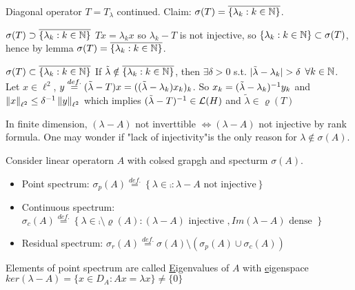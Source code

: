 \begin{example}\nl
	Diagonal operator $T=T_\lambda$ continued. Claim: $\sigma(T)=\overline{\{\lambda_k:k\in\mathbb{N}\}}$.
	\begin{pf}{$\sigma(T)\supset\overline{\{\lambda_k:k\in\mathbb{N}\}}$}{}
		$Tx=\lambda_k x$ so $\lambda_k-T$ is not injective, so $\{\lambda_k:k\in\mathbb{N}\}\subset\sigma(T)$, hence by lemma $\sigma(T)=\overline{\{\lambda_k:k\in\mathbb{N}\}}$.
	\end{pf}

	\begin{pf}{$\sigma(T)\subset\overline{\{\lambda_k:k\in\mathbb{N}\}}$}{}
		If $\Tilde{\lambda}\notin\overline{\{\lambda_k:k\in\mathbb{N}\}}$, then $\exists\delta>0$ s.t. $|\Tilde{\lambda}-\lambda_k|>\delta$ $\forall k\in\mathbb{N}$. Let $x\in\ell^2$, $y\stackrel{def.}{=}(\Tilde{\lambda}-T)x=((\Tilde{\lambda}-\lambda_k)x_k)_k$. So $x_k=(\Tilde{\lambda}-\lambda_k)^{-1}y_k$ and $\left\|{x}\right\|_{\ell^2}\leq\delta^{-1}\left\|{y}\right\|_{\ell^2}$ which implies $(\Tilde{\lambda}-T)^{-1}\in\mathcal{L}(H)$ and $\tilde{\lambda}\in\varrho(T)$
	\end{pf}
\end{example}

\begin{remark}\nl
	In finite dimension, $(\lambda-A)$ not inverttible $\iff(\lambda-A)$ not injective by rank formula. One may wonder if "lack of injectivity"is the only reason for $\lambda\notin \sigma(A)$.
\end{remark}

\begin{definition}\nl
	Consider linear operatorn $A$ with colsed grapgh and specturm $\sigma(A)$.
	\begin{itemize}
		\item Point spectrum: $\sigma_p(A)\stackrel{def.}{=}
			      \left\{
			      \lambda\in \comp :\lambda-A \text{ not  injective}
			      \right\}$
		\item Continuous spectrum: $\sigma_c(A)\stackrel{def.}{=}
			      \left\{
			      \lambda\in\comp\setminus\varrho(A):(\lambda-A) \text{ injective }, Im(\lambda-A) \text{ dense }
			      \right\}$
		\item Residual spectrum:  $\sigma_r(A)\stackrel{def.}{=}\sigma(A)\setminus(
			      \sigma_p(A)\cup\sigma_c(A))$
	\end{itemize}
	Elements of point spectrum are called {\underline Eigenvalues of $A$} with {\underline eigenspace} $ker(\lambda-A)=\{x\in D_A:Ax=\lambda x\}\neq\{0\}$

\end{definition}

